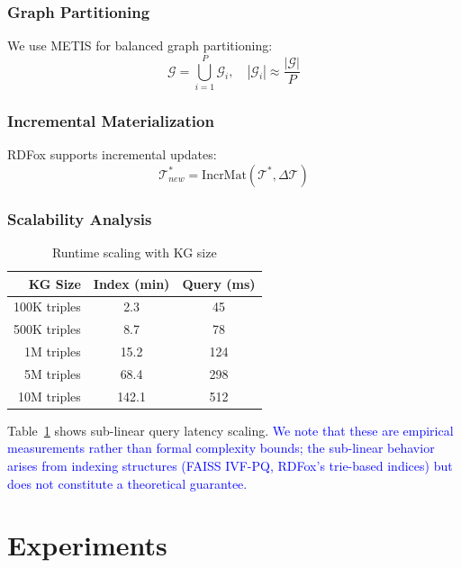 \documentclass[10pt,twocolumn]{article}
\newcommand{\revision}[1]{\textcolor{blue}{#1}}
\begin{document}
\subsubsection{Graph Partitioning}
We use METIS \cite{karypis1998metis} for balanced graph partitioning:
\begin{equation}
\mathcal{G} = \bigcup_{i=1}^{P} \mathcal{G}_i, \quad |\mathcal{G}_i| \approx \frac{|\mathcal{G}|}{P}
\end{equation}

\subsubsection{Incremental Materialization}
RDFox supports incremental updates:
\begin{equation}
\mathcal{T}^*_{new} = \text{IncrMat}(\mathcal{T}^*, \Delta\mathcal{T})
\end{equation}

\subsubsection{Scalability Analysis}

\begin{table}[t]
\centering
\caption{Runtime scaling with KG size}
\label{tab:scale}
\small
\begin{tabular}{@{}rcc@{}}
\toprule
\textbf{KG Size} & \textbf{Index (min)} & \textbf{Query (ms)} \\
\midrule
100K triples & 2.3 & 45 \\
500K triples & 8.7 & 78 \\
1M triples & 15.2 & 124 \\
5M triples & 68.4 & 298 \\
10M triples & 142.1 & 512 \\
\bottomrule
\end{tabular}
\end{table}

Table~\ref{tab:scale} shows sub-linear query latency scaling. \revision{We note that these are empirical measurements rather than formal complexity bounds; the sub-linear behavior arises from indexing structures (FAISS IVF-PQ, RDFox's trie-based indices) but does not constitute a theoretical guarantee.}

\section{Experiments}
\label{sec:experiments}
\end{document}

